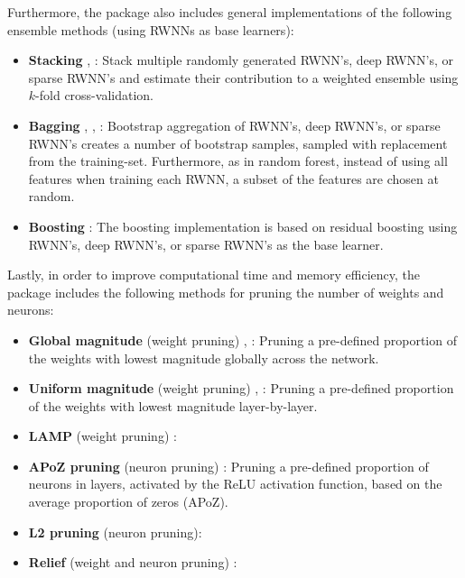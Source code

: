 \documentclass[
]{jss}
\providecommand{\tightlist}{%
  \setlength{\itemsep}{0pt}\setlength{\parskip}{0pt}}
\begin{document}
Furthermore, the  package also includes general
implementations of the following ensemble methods (using RWNNs as base
learners):

\begin{itemize}
\tightlist
\item
  \textbf{Stacking} \citep{Wolpert1992}, \citep{Breiman1996a}: Stack
  multiple randomly generated RWNN's, deep RWNN's, or sparse RWNN's and
  estimate their contribution to a weighted ensemble using \(k\)-fold
  cross-validation.
\item
  \textbf{Bagging} \citep{Breiman1996b}, \citep{Breiman2001},
  \citep{Xin2021}: Bootstrap aggregation of RWNN's, deep RWNN's, or
  sparse RWNN's creates a number of bootstrap samples, sampled with
  replacement from the training-set. Furthermore, as in random forest,
  instead of using all features when training each RWNN, a subset of the
  features are chosen at random.
\item
  \textbf{Boosting} \citep{Friedman2001}: The boosting implementation is
  based on residual boosting using RWNN's, deep RWNN's, or sparse RWNN's
  as the base learner.
\end{itemize}

Lastly, in order to improve computational time and memory efficiency,
the  package includes the following methods for pruning the
number of weights and neurons:

\begin{itemize}
\tightlist
\item
  \textbf{Global magnitude} (weight pruning) \citep{han2016},
  \citep{morcos2019}: Pruning a pre-defined proportion of the weights
  with lowest magnitude globally across the network.
\item
  \textbf{Uniform magnitude} (weight pruning) \citep{han2016},
  \citep{morcos2019}: Pruning a pre-defined proportion of the weights
  with lowest magnitude layer-by-layer.
\item
  \textbf{LAMP} (weight pruning) \citep{Lee2021}:
\item
  \textbf{APoZ pruning} (neuron pruning) \citep{hu2016}: Pruning a
  pre-defined proportion of neurons in layers, activated by the ReLU
  activation function, based on the average proportion of zeros (APoZ).
\item
  \textbf{L2 pruning} (neuron pruning):
\item
  \textbf{Relief} (weight and neuron pruning) \citep{Dekhovich2024}:
\end{itemize}
\end{document}

